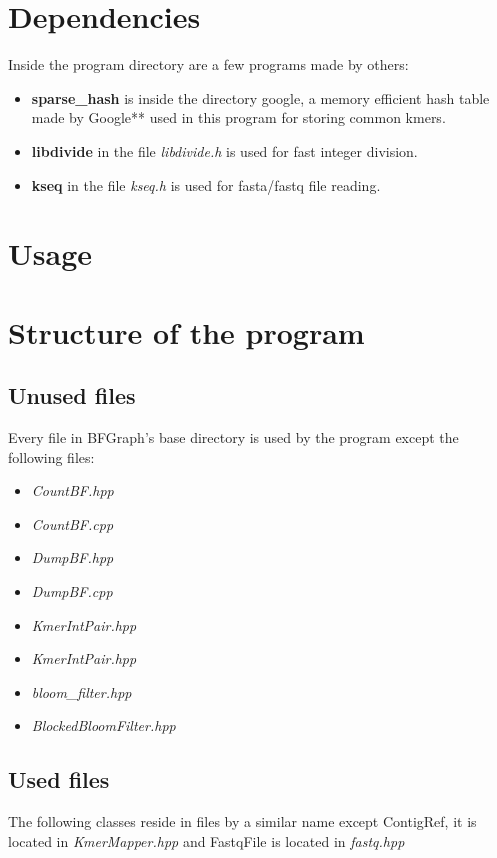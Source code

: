 \documentclass[a4paper]{report}
\renewcommand{\b}[1]{\textbf{#1}}  %
\begin{document}
\chapter{Dependencies}
Inside the program directory are a few programs made by others:

\begin{itemize}
\item \b{sparse\_hash}\cite{sparsehash} is inside the directory google, a memory efficient hash table made by Google**
    used in this program for storing common kmers.
\item \b{libdivide}\cite{libdivide} in the file \emph{libdivide.h} is used for fast integer division.
\item \b{kseq}\cite{kseq} in the file \emph{kseq.h} is used for fasta/fastq file reading.
\end{itemize}

\chapter{Usage}

\chapter{Structure of the program}

\section{Unused files}
Every file in BFGraph's base directory is used by the program except the following files:

\begin{itemize}
\item \emph{CountBF.hpp}
\item \emph{CountBF.cpp}
\item \emph{DumpBF.hpp}
\item \emph{DumpBF.cpp}
\item \emph{KmerIntPair.hpp}
\item \emph{KmerIntPair.hpp}
\item \emph{bloom\_filter.hpp}
\item \emph{BlockedBloomFilter.hpp}
\end{itemize}

\section{Used files}
The following classes reside in files by a similar name except ContigRef, it is located in \emph{KmerMapper.hpp} and
FastqFile is located in \emph{fastq.hpp}
\end{document}

